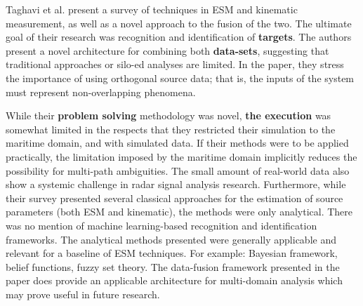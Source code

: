 Taghavi et al. \cite{taghavi_object_2016} present a survey of techniques in \ac{ESM} and kinematic measurement, as well as a novel approach to the fusion of the two. 
The ultimate goal of their research was recognition and identification of \textbf{targets}. 
The authors present a novel architecture for combining both \textbf{data-sets}, suggesting that traditional approaches or silo-ed analyses are limited. 
In the paper, they stress the importance of using orthogonal source data; that is, the inputs of the system must represent non-overlapping phenomena.

While their \textbf{problem solving} methodology was novel, 
\textbf{the execution} was somewhat limited in the respects that they restricted their simulation to the maritime domain, and with simulated data.
If their methods were to be applied practically, the limitation imposed by the maritime domain implicitly reduces the possibility for multi-path ambiguities.
The small amount of real-world data also show a systemic challenge in radar signal analysis research.
Furthermore, while their survey presented several classical approaches for the estimation of source parameters (both \ac{ESM} and kinematic), the methods were only analytical.
There was no mention of machine learning-based recognition and identification frameworks. The analytical methods presented were generally applicable and relevant for a baseline of ESM techniques.
For example: Bayesian framework, belief functions, fuzzy set theory.
The data-fusion framework presented in the paper does provide an applicable architecture for multi-domain analysis which may prove useful in future research.

